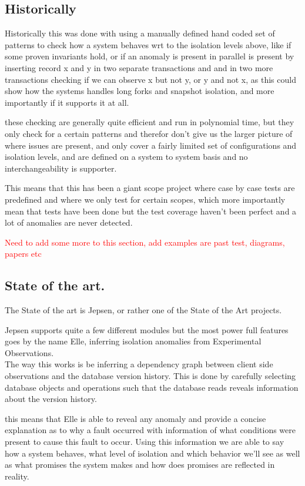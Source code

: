 \documentclass[a4paper,10pt,titlepage]{report}
\begin{document}
\subsection{Historically}

Historically this was done with using a manually defined hand coded set of patterns to check how a system behaves wrt to the isolation levels above, like if some proven invariants hold, or if an anomaly is present in parallel is present by inserting record x and y in two separate transactions and and in two more transactions checking if we can observe x but not y, or y and not x, as this could show how the systems handles long forks and snapshot isolation, and more importantly if it supports it at all.

these checking are generally quite efficient and run in polynomial time, but they only check for a certain patterns and therefor don't give us the larger picture of where issues are present, and only cover a fairly limited set of configurations and isolation levels, and are defined on a system to system basis and no interchangeability is supporter.

This means that this has been a giant scope project where case by case tests are predefined and where we only test for certain scopes, which more importantly mean that tests have been done but the test coverage haven't been perfect and a lot of anomalies are never detected.

\textcolor{red}{Need to add some more to this section, add examples are past test, diagrams, papers etc}

\subsection{State of the art.}

The State of the art is Jepsen, or rather one of the State of the Art projects.

Jepsen supports quite a few different modules but the most power full features goes by the name Elle, inferring isolation anomalies from Experimental Observations. \\

The way this works is be inferring a dependency graph between client side observations and the database version history. This is done by carefully selecting database objects and operations such that the database reads reveals information about the version history.

this means that Elle is able to reveal any anomaly and provide a concise explanation as to why a fault occurred with information of what conditions were present to cause this fault to occur. Using this information we are able to say how a system behaves, what level of isolation and which behavior we'll see as well as what promises the system makes and how does promises are reflected in reality.
\end{document}
